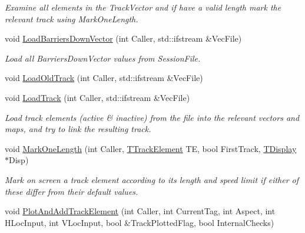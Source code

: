 \begin{DoxyCompactItemize}
\begin{DoxyCompactList}\small\item\em Examine all elements in the Track\+Vector and if have a valid length mark the relevant track using Mark\+One\+Length. \end{DoxyCompactList}\item 
\mbox{\label{class_t_track_a96563ccfea0293d240212db434f4e3e0}} 
void \mbox{\hyperlink{class_t_track_a96563ccfea0293d240212db434f4e3e0}{Load\+Barriers\+Down\+Vector}} (int Caller, std\+::ifstream \&Vec\+File)
\begin{DoxyCompactList}\small\item\em Load all Barriers\+Down\+Vector values from Session\+File. \end{DoxyCompactList}\item 
void \mbox{\hyperlink{class_t_track_abff18c1d577e257279c816da8868f232}{Load\+Old\+Track}} (int Caller, std\+::ifstream \&Vec\+File)
\item 
\mbox{\label{class_t_track_adcd1d019cbdb0d0dbfa44a41dc98ba07}} 
void \mbox{\hyperlink{class_t_track_adcd1d019cbdb0d0dbfa44a41dc98ba07}{Load\+Track}} (int Caller, std\+::ifstream \&Vec\+File)
\begin{DoxyCompactList}\small\item\em Load track elements (active \& inactive) from the file into the relevant vectors and maps, and try to link the resulting track. \end{DoxyCompactList}\item 
\mbox{\label{class_t_track_a6cab5ab84e10504ef1c9d39e931d42fe}} 
void \mbox{\hyperlink{class_t_track_a6cab5ab84e10504ef1c9d39e931d42fe}{Mark\+One\+Length}} (int Caller, \mbox{\hyperlink{class_t_track_element}{T\+Track\+Element}} TE, bool First\+Track, \mbox{\hyperlink{class_t_display}{T\+Display}} $\ast$Disp)
\begin{DoxyCompactList}\small\item\em Mark on screen a track element according to its length and speed limit if either of these differ from their default values. \end{DoxyCompactList}\item 
void \mbox{\hyperlink{class_t_track_a4385335a5bb0891cdbf2b6d0f0aabdf2}{Plot\+And\+Add\+Track\+Element}} (int Caller, int Current\+Tag, int Aspect, int H\+Loc\+Input, int V\+Loc\+Input, bool \&Track\+Plotted\+Flag, bool Internal\+Checks)

\end{DoxyCompactItemize}
